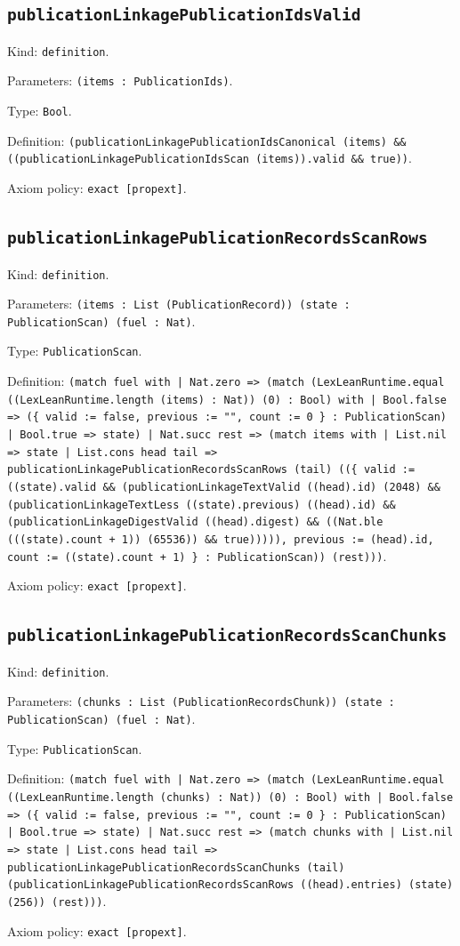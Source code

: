 \documentclass[11pt]{article}
\begin{document}
\subsection*{\texttt{publicationLinkagePublicationIdsValid}}
\noindent Kind: \texttt{definition}.\par
\noindent Parameters: \texttt{(items : PublicationIds)}.\par
\noindent Type: \texttt{Bool}.\par
\noindent Definition: \texttt{(publicationLinkagePublicationIdsCanonical (items) \&\& ((publicationLinkagePublicationIdsScan (items)).valid \&\& true))}.\par
\noindent Axiom policy: \texttt{exact [propext]}.\par
\subsection*{\texttt{publicationLinkagePublicationRecordsScanRows}}
\noindent Kind: \texttt{definition}.\par
\noindent Parameters: \texttt{(items : List (PublicationRecord)) (state : PublicationScan) (fuel : Nat)}.\par
\noindent Type: \texttt{PublicationScan}.\par
\noindent Definition: \texttt{(match fuel with | Nat.zero => (match (LexLeanRuntime.equal ((LexLeanRuntime.length (items) : Nat)) (0) : Bool) with | Bool.false => (\{ valid := false, previous := "", count := 0 \} : PublicationScan) | Bool.true => state) | Nat.succ rest => (match items with | List.nil => state | List.cons head tail => publicationLinkagePublicationRecordsScanRows (tail) ((\{ valid := ((state).valid \&\& (publicationLinkageTextValid ((head).id) (2048) \&\& (publicationLinkageTextLess ((state).previous) ((head).id) \&\& (publicationLinkageDigestValid ((head).digest) \&\& ((Nat.ble (((state).count + 1)) (65536)) \&\& true))))), previous := (head).id, count := ((state).count + 1) \} : PublicationScan)) (rest)))}.\par
\noindent Axiom policy: \texttt{exact [propext]}.\par
\subsection*{\texttt{publicationLinkagePublicationRecordsScanChunks}}
\noindent Kind: \texttt{definition}.\par
\noindent Parameters: \texttt{(chunks : List (PublicationRecordsChunk)) (state : PublicationScan) (fuel : Nat)}.\par
\noindent Type: \texttt{PublicationScan}.\par
\noindent Definition: \texttt{(match fuel with | Nat.zero => (match (LexLeanRuntime.equal ((LexLeanRuntime.length (chunks) : Nat)) (0) : Bool) with | Bool.false => (\{ valid := false, previous := "", count := 0 \} : PublicationScan) | Bool.true => state) | Nat.succ rest => (match chunks with | List.nil => state | List.cons head tail => publicationLinkagePublicationRecordsScanChunks (tail) (publicationLinkagePublicationRecordsScanRows ((head).entries) (state) (256)) (rest)))}.\par
\noindent Axiom policy: \texttt{exact [propext]}.\par
\end{document}
